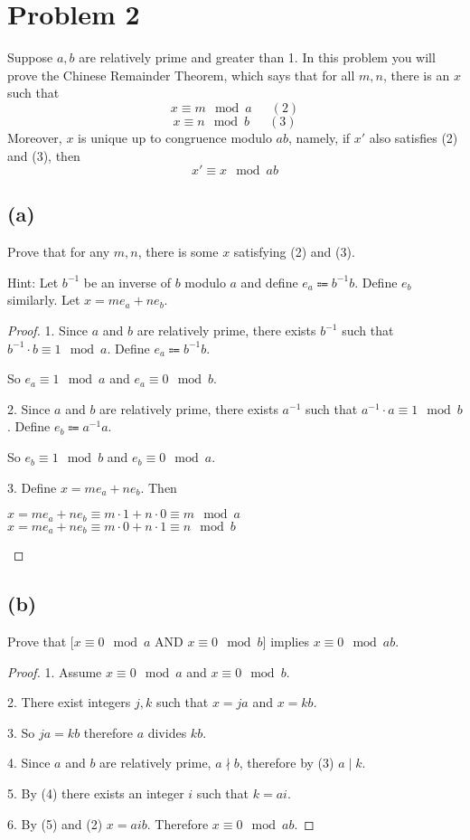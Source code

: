 \documentclass[14pt]{extarticle}
\begin{document}
\section{Problem 2}
Suppose $a, b$ are relatively prime and greater than 1. In this problem you will prove the Chinese Remainder Theorem, which says that for all $m, n$, there is an $x$ such that
$$
x \equiv m \mod a \,\,\,\,\,\,\,\,\,(2)
$$
$$
x \equiv n \mod b \,\,\,\,\,\,\,\,\,(3)
$$
Moreover, $x$ is unique up to congruence modulo $ab$, namely, if $x'$ also satisfies (2) and (3), then
$$
x' \equiv x \mod ab
$$
\subsection{(a)}
Prove that for any $m, n$, there is some $x$ satisfying (2) and (3).

Hint: Let $b^{-1}$ be an inverse of $b$ modulo $a$ and define $e_a \Coloneqq b^{-1} b$. Define $e_b$ similarly. Let $x = me_a + ne_b$.
\begin{proof}
1. Since $a$ and $b$ are relatively prime, there exists $b^{-1}$ such that $b^{-1} \cdot b \equiv 1 \mod a$. Define $e_a \Coloneqq b^{-1} b$. 

So $e_a \equiv 1 \mod a$ and $e_a \equiv 0 \mod b$.

2. Since $a$ and $b$ are relatively prime, there exists $a^{-1}$ such that $a^{-1} \cdot a \equiv 1 \mod b$. Define $e_b \Coloneqq a^{-1} a$.

So $e_b \equiv 1 \mod b$ and $e_b \equiv 0 \mod a$.

3. Define $x = me_a + ne_b$. Then
\begin{center}
$x = me_a + ne_b \equiv m \cdot 1 + n \cdot 0 \equiv m \mod a$\\
$x = me_a + ne_b \equiv m \cdot 0 + n \cdot 1 \equiv n \mod b$
\end{center}
\end{proof}

\subsection{(b)}
Prove that $[x \equiv 0 \mod a$ AND $x \equiv 0 \mod b]$ implies $x \equiv 0 \mod ab$.
\begin{proof}
1. Assume $x \equiv 0 \mod a$ and $x \equiv 0 \mod b$.

2. There exist integers $j, k$ such that $x = ja$ and $x = kb$.

3. So $ja = kb$ therefore $a$ divides $kb$.

4. Since $a$ and $b$ are relatively prime, $a \nmid b$, therefore by (3) $a \mid k$.

5. By (4) there exists an integer $i$ such that $k = ai$.

6. By (5) and (2) $x = aib$. Therefore $x \equiv 0 \mod ab$.
\end{proof}
\end{document}
